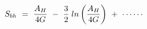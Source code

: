 \begin{equation}{\label3}
  S_{bh} ~=~ \frac{A_H}{4G} ~-~ \frac{3}{2} \; ln\left(\frac{A_H}{4G}\right)
~+~\cdots \cdots\;
\end{equation}

